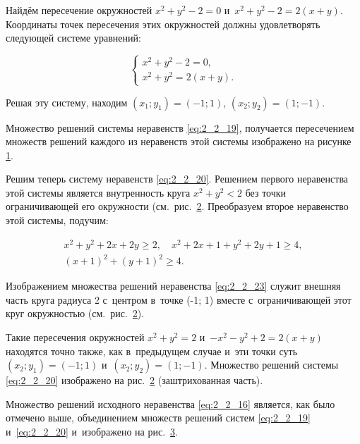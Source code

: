 Найдём пересечение окружностей $x^{2} + y^{2} - 2 = 0$
и~$x^{2} + y^{2} - 2 = 2(x + y)$.
Координаты точек пересечения этих окружностей должны удовлетворять следующей
системе уравнений:

\begin{equation}\label{eq:2_2_22}
\begin{cases}
x^{2} + y^{2} - 2 = 0, \\
x^{2} + y^{2} = 2(x + y).
\end{cases}
\end{equation}

\noindent
Решая эту систему, находим $(x_{1}; y_{1}) = (-1; 1)$, $(x_{2}; y_{2}) = (1; -1)$.

Множество решений системы неравенств \eqref{eq:2_2_19}, получается пересечением
множеств решений каждого из неравенств этой системы изображено на рисунке
\ref{fig:2_2_6}.

\begin{figure}\label{fig:2_2_6}
\end{figure} 

\begin{figure}\label{fig:2_2_7}
\end{figure}

Решим теперь систему неравенств \eqref{eq:2_2_20}.
Решением первого неравенства этой системы является внутренность круга
$x^{2} + y^{2} < 2$ без точки ограничивающей его окружности
(см.\ рис.\ \ref{fig:2_2_7}.
Преобразуем второе неравенство этой системы, подучим:

\begin{gather}\label{eq:2_2_23}
x^{2} + y^{2} + 2x + 2y \geqslant 2, \quad
x^{2} + 2x + 1 + y^{2} + 2y + 1 \geqslant 4, \nonumber \\
(x + 1)^{2} + (y + 1)^{2} \geqslant 4.
\end{gather}

\noindent
Изображением множества решений неравенства \eqref{eq:2_2_23} служит внешняя
часть круга радиуса 2 с~центром в~точке (-1; 1) вместе с~ограничивающей
этот круг окружностью (см.\ рис.\ \ref{fig:2_2_7}).

Такие пересечения окружностей $x^{2} + y^{2} = 2$
и~$-x^{2} - y^{2} +2 = 2(x + y)$ находятся точно также, как в~предыдущем случае
и~эти точки суть $(x_{2}; y_{1}) = (-1; 1)$ и~$(x_{2}; y_{2}) = (1; -1)$.
Множество решений системы \eqref{eq:2_2_20} изображено на рис.\ \ref{fig:2_2_7}
(заштрихованная часть).

Множество решений исходного неравенства \eqref{eq:2_2_16} является,
как было отмечено выше, объединением множеств решений систем
\eqref{eq:2_2_19} и~\eqref{eq:2_2_20} и~изображено на рис.\ \ref{fig:2_2_8}.

\begin{figure}\label{fig:2_2_8}
\end{figure}
